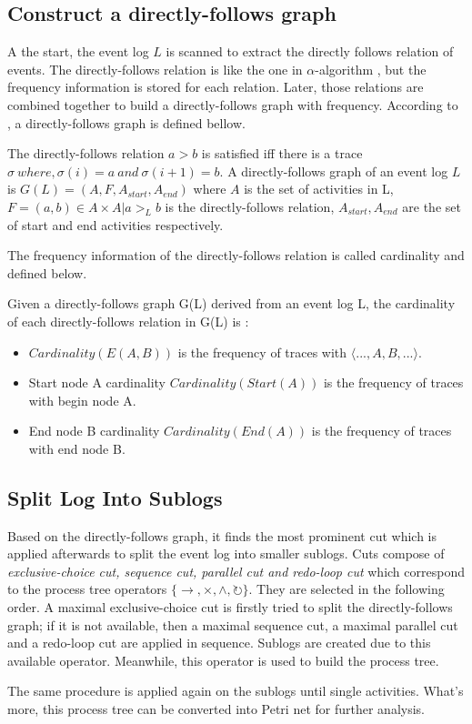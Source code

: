 \subsection{Construct a directly-follows graph}
A the start, the event log $L$ is scanned to extract the directly follows relation of events. The directly-follows relation is like the one in $\alpha$-algorithm \cite{van2004workflow, leemans2013discovering}, but the frequency information is stored for each relation. Later, those relations are combined together to build a directly-follows graph with frequency. According to \cite{van2016data, leemans2013discovering}, a directly-follows graph is defined bellow.
\begin{definition}
 The directly-follows relation $a > b$ is satisfied iff there is a trace $\sigma\ where, \sigma(i)=a \ and \ \sigma(i+1)=b$.
 A directly-follows graph of an event log $L$ is $G(L) = (A, F, A_{start}, A_{end}) $ where $A$ is the set of activities in L, $F={(a,b) \in A \times A | a >_L b} $ is the directly-follows relation, $A_{start}, A_{end}$ are the set of start and end activities respectively.
\end{definition}
The frequency information of the directly-follows relation is called cardinality and defined below.
\begin{definition}
Given a directly-follows graph G(L) derived from an event log L, the cardinality of each directly-follows relation in G(L) is :  
	\begin{itemize}
		\item $Cardinality(E(A,B))$ is the frequency of traces with $\langle ...,A,B,... \rangle$. 
		\item Start node A cardinality $Cardinality(Start(A))$ is the frequency of traces with begin node A.
		\item End node B cardinality $Cardinality(End(A))$ is the frequency of traces with end node B.
	\end{itemize}	
\end{definition}
\subsection{Split Log Into Sublogs}
Based on the directly-follows graph, it finds the most prominent cut which is applied afterwards to split the event log into smaller sublogs. Cuts compose of \emph{exclusive-choice cut, sequence cut, parallel cut and redo-loop cut} which correspond to the process tree operators $ \{\rightarrow, \times, \land, \circlearrowright \}$. They are selected in the following order. A maximal exclusive-choice cut is firstly tried to split the directly-follows graph; if it is not available, then a maximal sequence cut, a  maximal parallel cut and a redo-loop cut are applied in sequence. Sublogs are created due to this available operator. Meanwhile, this operator is used to build the process tree. 

The same procedure is applied again on the sublogs until single activities. What's more, this process tree can be converted into Petri net for further analysis.